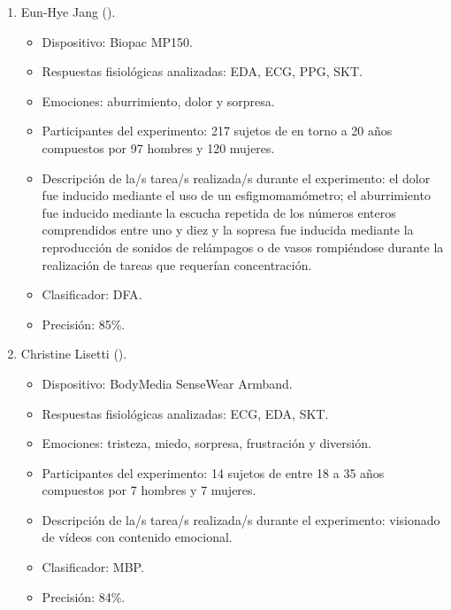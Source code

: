 \begin{enumerate}
    \item Eun-Hye Jang (\citeyear{jang2015analysis}).
    \begin{itemize}
        \item Dispositivo: Biopac MP150.
        \item Respuestas fisiológicas analizadas: EDA, ECG, PPG, SKT.
        \item Emociones: aburrimiento, dolor y sorpresa.
        \item Participantes del experimento: 217 sujetos de en torno a 20 años compuestos por 97 hombres y 120 mujeres.
        \item Descripción de la/s tarea/s realizada/s durante el experimento: el dolor fue inducido mediante el uso de un esfigmomamómetro; el aburrimiento fue inducido mediante la escucha repetida de los números enteros comprendidos entre uno y diez y la sopresa fue inducida mediante la reproducción de sonidos de relámpagos o de vasos rompiéndose durante la realización de tareas que requerían concentración.
        \item Clasificador: \ac{DFA}.
        \item Precisión: 85\%.
    \end{itemize}

    \item Christine Lisetti (\citeyear{lisetti2004using}).
    \begin{itemize}
        \item Dispositivo: BodyMedia SenseWear Armband.
        \item Respuestas fisiológicas analizadas: ECG, EDA, SKT.
        \item Emociones: tristeza, miedo, sorpresa, frustración y diversión.
        \item Participantes del experimento: 14 sujetos de entre 18 a 35 años compuestos por 7 hombres y 7 mujeres.
        \item Descripción de la/s tarea/s realizada/s durante el experimento: visionado de vídeos con contenido emocional.
        \item Clasificador: \ac{MBP}.
        \item Precisión: 84\%.
    \end{itemize}


\end{enumerate}
